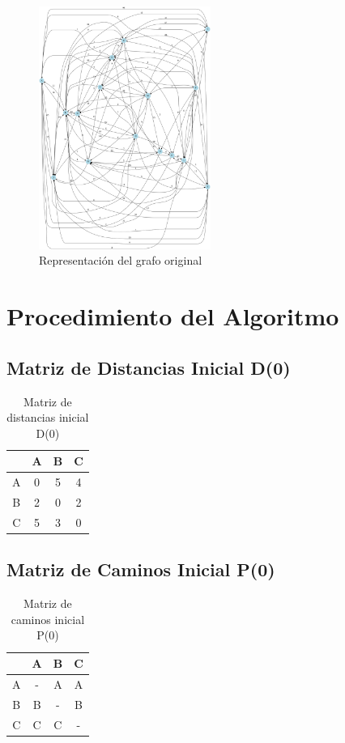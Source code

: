 \documentclass[12pt]{article}
\begin{document}
\begin{figure}[h!]
\centering
\includegraphics[width=0.5\textwidth,keepaspectratio]{grafo.png}
\caption{Representación del grafo original}
\end{figure}

\clearpage
\section{Procedimiento del Algoritmo}
\subsection{Matriz de Distancias Inicial D(0)}
\begin{table}[h!]
\centering
\begin{tabular}{|c|c|c|c|}
\hline
 & A & B & C \\\hline
A & 0 & 5 & 4 \\\hline
B & 2 & 0 & 2 \\\hline
C & 5 & 3 & 0 \\\hline
\end{tabular}
\caption{Matriz de distancias inicial D(0)}
\end{table}

\clearpage
\subsection{Matriz de Caminos Inicial P(0)}
\begin{table}[h!]
\centering
\begin{tabular}{|c|c|c|c|}
\hline
 & A & B & C \\\hline
A & - & A & A \\\hline
B & B & - & B \\\hline
C & C & C & - \\\hline
\end{tabular}
\caption{Matriz de caminos inicial P(0)}
\end{table}
\end{document}

